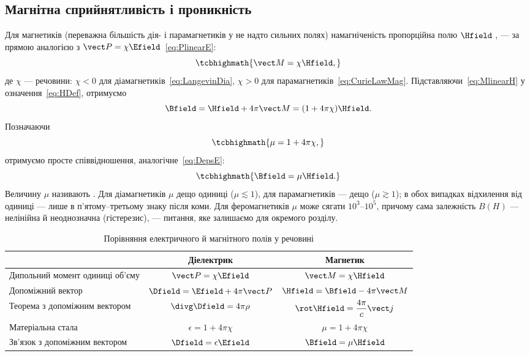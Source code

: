 \subsection*{Магнітна сприйнятливість і проникність}

Для  магнетиків (переважна більшість дія- і парамагнетиків у не надто сильних полях) намагніченість пропорційна полю
$\Hfield$ , --- за прямою аналогією з $\vect P=\chi\Efield$~\eqref{eq:PlinearE}:
\begin{equation}\label{eq:MlinearH}
	\tcbhighmath{
		\Mfield = \chi\Hfield,
	}
\end{equation}
де $\chi$ ---  речовини: $\chi<0$ для діамагнетиків~\eqref{eq:LangevinDia}, $\chi>0$ для
парамагнетиків~\eqref{eq:CurieLawMag}. Підставляючи~\eqref{eq:MlinearH} у означення~\eqref{eq:HDef}, отримуємо
\begin{equation*}
	\Bfield = \Hfield+4\pi\Mfield = (1+4\pi\chi)\Hfield.
\end{equation*}
Позначаючи
\begin{equation}\label{eq:MuDef}
	\tcbhighmath{
		\mu = 1+4\pi\chi,
	}
\end{equation}
отримуємо просте співвідношення, аналогічне~\eqref{eq:DepsE}:
\begin{equation}\label{eq:BmuH}
	\tcbhighmath{
		\Bfield = \mu\Hfield.
	}
\end{equation}
Величину $\mu$ називають . Для діамагнетиків $\mu$ дещо  одиниці ($\mu\lesssim1$), для
парамагнетиків --- дещо  ($\mu\gtrsim1$); в обох випадках відхилення від одиниці --- лише в п'ятому--третьому знаку після коми. Для
феромагнетиків $\mu$ може сягати $10^3$--$10^5$, причому сама залежність $B(H)$ --- нелінійна й неоднозначна (гістерезис), --- питання, яке
залишаємо для окремого розділу.

\begin{table}[h!]\small\centering
	\caption{Порівняння електричного й магнітного полів у речовині\label{tab:ElMagCompareMatter}}
	\begin{tabular}{lcc}
		\toprule
		            & Діелектрик & Магнетик \\
		\midrule
		Дипольний момент одиниці об'єму & $\vect P=\chi\Efield$ & $\Mfield=\chi\Hfield$ \\
		Допоміжний вектор & $\Dfield=\Efield+4\pi\vect P$ & $\Hfield=\Bfield-4\pi\Mfield$ \\
		Теорема з допоміжним вектором & $\divg\Dfield=4\pi\rho$ & $\rot\Hfield=\dfrac{4\pi}c\vect j$ \\
		Матеріальна стала & $\epsilon=1+4\pi\chi$ & $\mu=1+4\pi\chi$ \\
		Зв'язок з допоміжним вектором & $\Dfield=\epsilon\Efield$ & $\Bfield=\mu\Hfield$ \\
		\bottomrule
	\end{tabular}
\end{table}

